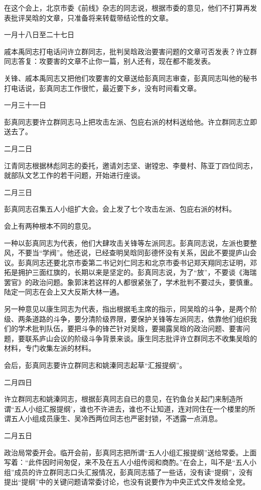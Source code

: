 \begin{maonote}
在这个会上，北京市委《前线》杂志的同志说，根据市委的意见，他们不打算再发表批评吴晗的文章，只准备将来转载带结论性的文章。

一月十八日至二十七日

戚本禹同志打电话问许立群同志，批判吴晗政治要害问题的文章可否发表？许立群同志答复：攻要害的文章不止你一篇，别人还有，现在都不能发表。

关锋、戚本禹同志又把他们攻要害的文章送给彭真同志审查，彭真同志叫他的秘书打电话说，彭真同志工作很忙，最近要下乡，没有时间看文章。

一月三十一日

彭真同志要许立群同志马上把攻击左派、包庇右派的材料送给他。许立群同志立即送去了。

二月二日

江青同志根据林彪同志的委托，邀请刘志坚、谢镗忠、李曼村、陈亚丁四位同志，就部队文艺工作的若干问题，开始进行座谈。

二月三日

彭真同志召集五人小组扩大会。会上发了七个攻击左派、包庇右派的材料。

会上有两种根本不同的意见。

一种以彭真同志为代表，他们大肆攻击关锋等左派同志。彭真同志说，左派也要整风，不要当“学阀”。他还说，已经查明吴晗同彭德怀没有关系，因此不要提庐山会议。彭真同志还要北京市委第二书记刘仁同志和北京市委书记郑天翔同志证明，邓拓是拥护三面红旗的，长期以来是坚定的。彭真同志说，为了“放”，不要谈《海瑞罢官》的政治问题。象郭沫若这样的人都很紧张了，学术批判不要过头，要慎重。陆定一同志在会上又大反斯大林一通。

另一种意见以康生同志为代表，指出根据毛主席的指示，同吴晗的斗争，是两个阶级、两条道路的斗争，要分清阶级界限，要保护关锋等左派同志，依靠他们组织我们的学术批判队伍，要把斗争的锋芒针对吴晗，要揭露吴晗的政治问题、要害问题，要联系庐山会议的阶级斗争背景来谈。康生同志批评许立群同志不收集吴晗的材料，专门收集左派的材料。

会后，彭真同志要许立群同志和姚溱同志起草“汇报提纲”。

二月四日

许立群同志和姚溱同志，根据彭真同志自已的意见，在钓鱼台关起门来制造所谓“五人小组汇报提纲’，谁也不许进去，谁也不让知道，连对同住在一个楼里的所谓五人小组成员康生、吴冷西两位同志也严密封锁，不透露一点消息。

二月五日

政治局常委开会。临开会前，彭真同志把所谓“五人小组汇报提纲”送给常委。上面写着：“此件因时间匆促，来不及在五人小组传阅和商酌。”在会上，叫不是“五人小组”成员的许立群同志口头汇报情况，彭真同志插了一些话，没有读“提纲”，没有提出“提纲”中的关键问题请常委讨论，也没有说要作为中央正式文件发给全党。


\end{maonote}
